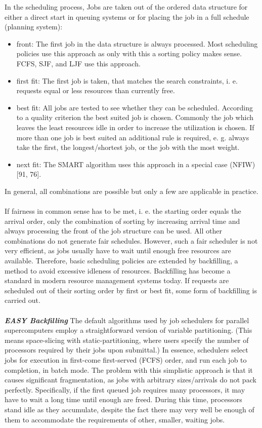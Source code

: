 In the scheduling process, Jobs are taken out of the ordered data structure for either a direct start in queuing systems or for placing the job in a full schedule (planning system):
\begin{itemize}
\item front: The first job in the data structure is always processed. Most scheduling policies use this approach as only with this a sorting policy makes sense. FCFS, SJF, and LJF use this approach.
\item first fit: The first job is taken, that matches the search constraints, i. e. requests equal or less resources than currently free.
\item best fit: All jobs are tested to see whether they can be scheduled. According to a quality criterion the best suited job is chosen. Commonly the job which leaves the least resources idle in order to increase the utilization is chosen. If more than one job is best suited an additional rule is required, e. g. always take the first, the longest/shortest job, or the job with the most weight.
\item next fit: The SMART algorithm uses this approach in a special case (NFIW) [91, 76].
\end{itemize}
In general, all combinations are possible but only a few are applicable in practice.\\ \\
If fairness in common sense has to be met, i. e. the starting order equals the arrival order, only the combination of sorting by increasing arrival time and always processing the front of the job structure can be used. All other combinations do not generate fair schedules. However, such a fair scheduler is not very efficient, as jobs usually have to wait until enough free resources are available. Therefore, basic scheduling policies are extended by backfilling, a method to avoid excessive idleness of resources. Backfilling has become a standard in modern resource management systems today. If requests are scheduled out of their sorting order by first or best fit, some form of backfilling is carried out.\\ \\
\textbf{\textit{EASY Backfilling }}The default algorithms used by job schedulers for parallel supercomputers employ a straightforward version of variable partitioning. (This means space-slicing with static-partitioning, where users specify the number of processors required by their jobs upon submittal.) In essence, schedulers select jobs for execution in first-come first-served (FCFS) order, and run each job to completion, in batch mode. The problem with this simplistic approach is that it causes significant fragmentation, as jobs with arbitrary sizes/arrivals do not pack perfectly. Specifically, if the first queued job requires many processors, it may have to wait a long time until enough are freed. During this time, processors stand idle as they accumulate, despite the fact there may very well be enough of them to accommodate the requirements of other, smaller, waiting jobs.\\ \\
